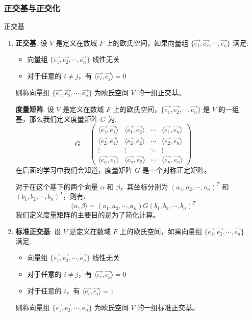 \documentclass[a4paper,12pt]{ctexart}
\begin{document}
\subsubsection{正交基与正交化}

    \begin{mydef}{正交基}{}
    \begin{enumerate}
    \item \textbf{正交基}: 设 $V$ 是定义在数域 $F$ 上的欧氏空间，如果向量组 $\{\vec{e_1}, \vec{e_2}, \cdots, \vec{e_n}\}$ 满足:
    \begin{itemize}
        \item 向量组 $\{\vec{e_1}, \vec{e_2}, \cdots, \vec{e_n}\}$ 线性无关
        \item 对于任意的 $i \neq j$，有 $\langle \vec{e_i}, \vec{e_j} \rangle = 0$
    \end{itemize}
    则称向量组 $\{\vec{e_1}, \vec{e_2}, \cdots, \vec{e_n}\}$ 为欧氏空间 $V$ 的一组正交基。
    
    \textbf{度量矩阵}: 设 $V$ 是定义在数域 $F$ 上的欧氏空间，$\{\vec{e_1}, \vec{e_2}, \cdots, \vec{e_n}\}$ 是 $V$ 的一组基，那么我们定义度量矩阵 $G$ 为:
    \[
    G = \begin{pmatrix}
    \langle \vec{e_1}, \vec{e_1} \rangle & \langle \vec{e_1}, \vec{e_2} \rangle & \cdots & \langle \vec{e_1}, \vec{e_n} \rangle \\
    \langle \vec{e_2}, \vec{e_1} \rangle & \langle \vec{e_2}, \vec{e_2} \rangle & \cdots & \langle \vec{e_2}, \vec{e_n} \rangle \\
    \vdots & \vdots & \ddots & \vdots \\
    \langle \vec{e_n}, \vec{e_1} \rangle & \langle \vec{e_n}, \vec{e_2} \rangle & \cdots & \langle \vec{e_n}, \vec{e_n} \rangle
    \end{pmatrix}
    \]
    在后面的学习中我们会知道，度量矩阵 $G$ 是一个对称正定矩阵。
    
    对于在这个基下的两个向量 $\alpha$ 和 $\beta$，其坐标分别为 $(a_1, a_2, \cdots, a_n)^T$ 和 $(b_1, b_2, \cdots, b_n)^T$，则有:
    \[
    \langle \alpha, \beta \rangle = (a_1, a_2, \cdots, a_n) G (b_1, b_2, \cdots, b_n)^T
    \]
    我们定义度量矩阵的主要目的是为了简化计算。
    
    \item \textbf{标准正交基}: 设 $V$ 是定义在数域 $F$ 上的欧氏空间，如果向量组 $\{\vec{e_1}, \vec{e_2}, \cdots, \vec{e_n}\}$ 满足:
    \begin{itemize}
        \item 向量组 $\{\vec{e_1}, \vec{e_2}, \cdots, \vec{e_n}\}$ 线性无关
        \item 对于任意的 $i \neq j$，有 $\langle \vec{e_i}, \vec{e_j} \rangle = 0$
        \item 对于任意的 $i$，有 $\langle \vec{e_i}, \vec{e_i} \rangle = 1$
    \end{itemize}
    则称向量组 $\{\vec{e_1}, \vec{e_2}, \cdots, \vec{e_n}\}$ 为欧氏空间 $V$ 的一组标准正交基。
    \end{enumerate}
    \end{mydef}
\end{document}
